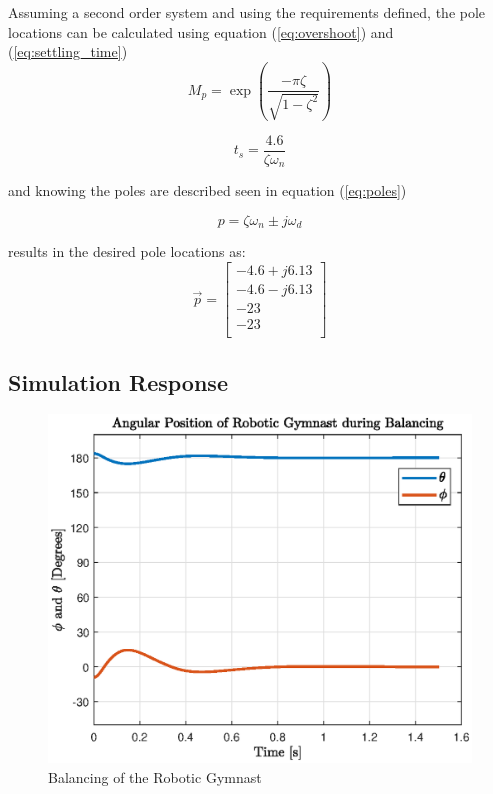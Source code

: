 Assuming a second order system and using the requirements defined, the pole locations can be calculated using equation (\ref{eq:overshoot}) and (\ref{eq:settling_time})
\begin{equation} \label{eq:overshoot}
M_{p} = \exp(\frac{-\pi \zeta}{ \sqrt{1-\zeta^2}})
\end{equation}

\begin{equation} \label{eq:settling_time}
t_{s} = \frac{4.6}{\zeta \omega_{n}}
\end{equation}

and knowing the poles are described seen in equation (\ref{eq:poles}) 

\begin{equation} \label{eq:poles}
p = \zeta \omega_{n} \pm j\omega_{d}
\end{equation}

results in the desired pole locations as:
 $$
 \vec{p} = 
 \begin{bmatrix}
  -4.6 + j6.13 \\
-4.6 - j6.13 \\
-23\\
-23\\
 \end{bmatrix}
 $$


\subsection{Simulation Response}
\begin{figure}[h]
	\centering
	\includegraphics[scale=1]{./figs/balancing}
	\caption{Balancing of the Robotic Gymnast}
	\label{fig:balance}
\end{figure}



